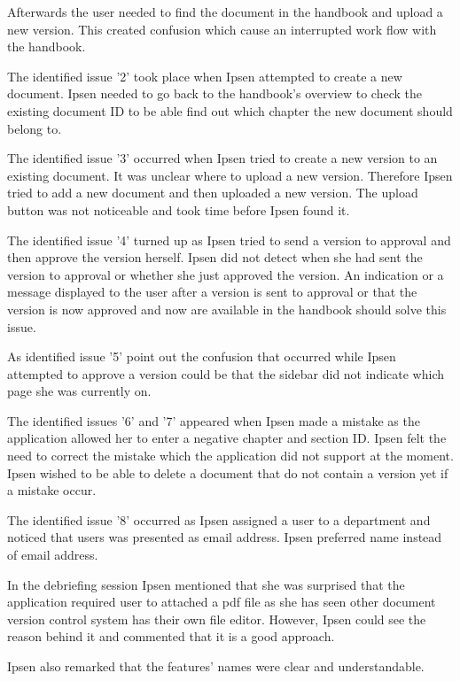 Afterwards the user needed to find the document in the handbook and upload a new version. 
This created confusion which cause an interrupted work flow with the handbook.

The identified issue '2' took place when Ipsen attempted to create a new document. 
Ipsen needed to go back to the handbook's overview to check the existing document ID to be able find out which chapter the new document should belong to. 

The identified issue '3' occurred when Ipsen tried to create a new version to an existing document. 
It was unclear where to upload a new version. 
Therefore Ipsen tried to add a new document and then uploaded a new version. 
The upload button was not noticeable and took time before Ipsen found it. 

The identified issue '4' turned up as Ipsen tried to send a version to approval and then  approve the version herself.
Ipsen did not detect when she had sent the version to approval or whether she just approved the version. 
An indication or a message displayed to the user after a version is sent to approval or that the version is now approved and now are available in the handbook should solve this issue.

As identified issue '5' point out the confusion that occurred while Ipsen attempted to approve a version could be that the sidebar did not indicate which page she was currently on. 

The identified issues '6' and '7' appeared when Ipsen made a mistake as the application allowed her to enter a negative chapter and section ID. 
Ipsen felt the need to correct the mistake which the application did not support at the moment.
Ipsen wished to be able to delete a document that do not contain a version yet if a mistake occur.

The identified issue '8' occurred as Ipsen assigned a user to a department and noticed that users was presented as email address.
Ipsen preferred name instead of email address.

In the debriefing session Ipsen mentioned that she was surprised that the application required user to attached a pdf file as she has seen other document version control system has their own file editor.
However, Ipsen could see the reason behind it and commented that it is a good approach.

Ipsen also remarked that the features' names were clear and understandable. 

